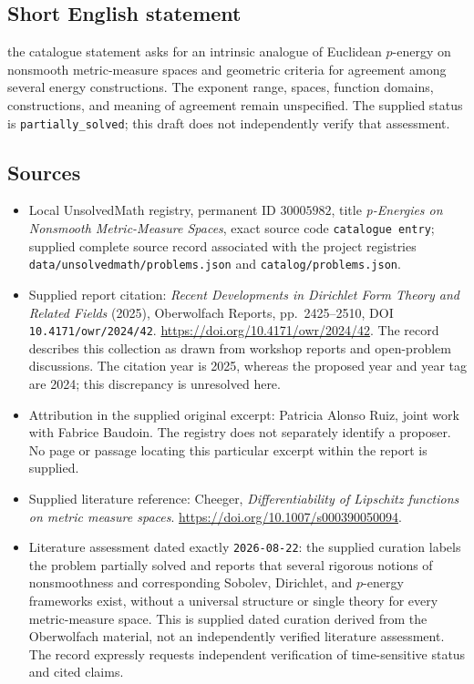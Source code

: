\documentclass[11pt]{article}
\begin{document}
\subsection{Short English statement}
the catalogue statement asks for an intrinsic analogue of Euclidean \(p\)-energy on nonsmooth metric-measure spaces and geometric criteria for agreement among several energy constructions. The exponent range, spaces, function domains, constructions, and meaning of agreement remain unspecified. The supplied status is \texttt{partially\_solved}; this draft does not independently verify that assessment.
\subsection{Sources}
\begin{itemize}
\item Local UnsolvedMath registry, permanent ID \(30005982\), title \emph{p-Energies on Nonsmooth Metric-Measure Spaces}, exact source code \texttt{catalogue entry}; supplied complete source record associated with the project registries \texttt{data/unsolvedmath/problems.json} and \texttt{catalog/problems.json}.
\item Supplied report citation: \emph{Recent Developments in Dirichlet Form Theory and Related Fields} (2025), Oberwolfach Reports, pp.~2425--2510, DOI \texttt{10.4171/owr/2024/42}. \url{https://doi.org/10.4171/owr/2024/42}. The record describes this collection as drawn from workshop reports and open-problem discussions. The citation year is 2025, whereas the proposed year and year tag are 2024; this discrepancy is unresolved here.
\item Attribution in the supplied original excerpt: Patricia Alonso Ruiz, joint work with Fabrice Baudoin. The registry does not separately identify a proposer. No page or passage locating this particular excerpt within the report is supplied.
\item Supplied literature reference: Cheeger, \emph{Differentiability of Lipschitz functions on metric measure spaces}. \url{https://doi.org/10.1007/s000390050094}.
\item Literature assessment dated exactly \texttt{2026-08-22}: the supplied curation labels the problem partially solved and reports that several rigorous notions of nonsmoothness and corresponding Sobolev, Dirichlet, and \(p\)-energy frameworks exist, without a universal structure or single theory for every metric-measure space. This is supplied dated curation derived from the Oberwolfach material, not an independently verified literature assessment. The record expressly requests independent verification of time-sensitive status and cited claims.
\end{itemize}
\end{document}

